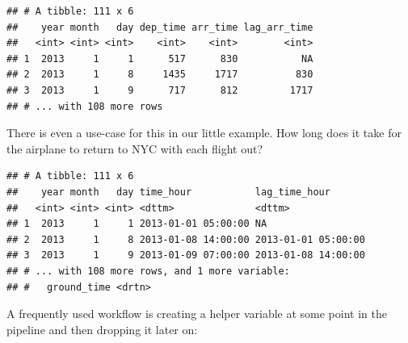 \documentclass[]{book}
\newenvironment{Shaded}{}{}
\newcommand{\DataTypeTok}[1]{#1}
\newcommand{\KeywordTok}[1]{\textcolor[rgb]{0.00,0.00,1.00}{#1}}
\newcommand{\NormalTok}[1]{#1}
\newcommand{\OperatorTok}[1]{#1}
\newcommand{\StringTok}[1]{\textcolor[rgb]{0.00,0.50,0.50}{#1}}
\begin{document}
\begin{verbatim}
## # A tibble: 111 x 6
##    year month   day dep_time arr_time lag_arr_time
##   <int> <int> <int>    <int>    <int>        <int>
## 1  2013     1     1      517      830           NA
## 2  2013     1     8     1435     1717          830
## 3  2013     1     9      717      812         1717
## # ... with 108 more rows
\end{verbatim}

There is even a use-case for this in our little example.
How long does it take for the airplane to return to NYC with each flight out?

\begin{Shaded}
\end{Shaded}

\begin{verbatim}
## # A tibble: 111 x 6
##    year month   day time_hour           lag_time_hour      
##   <int> <int> <int> <dttm>              <dttm>             
## 1  2013     1     1 2013-01-01 05:00:00 NA                 
## 2  2013     1     8 2013-01-08 14:00:00 2013-01-01 05:00:00
## 3  2013     1     9 2013-01-09 07:00:00 2013-01-08 14:00:00
## # ... with 108 more rows, and 1 more variable:
## #   ground_time <drtn>
\end{verbatim}

A frequently used workflow is creating a helper variable at some point in the pipeline and then dropping it later on:

\begin{Shaded}
\end{Shaded}
\end{document}
